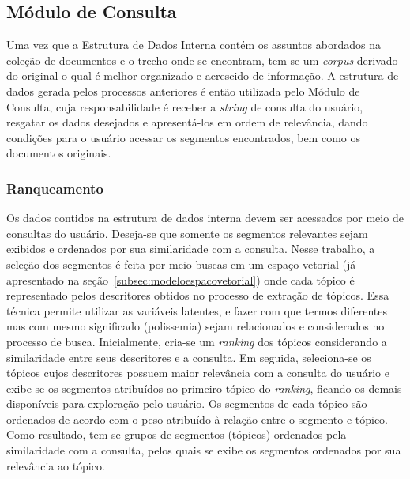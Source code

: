 
\subsection{Módulo de Consulta}


Uma vez que a Estrutura de Dados Interna contém os assuntos abordados na coleção de documentos e o trecho onde se encontram, tem-se um \textit{corpus} derivado do original o qual é melhor organizado e acrescido de informação. A estrutura de dados gerada pelos processos anteriores é então utilizada pelo Módulo de Consulta, cuja responsabilidade é receber a \textit{string} de consulta do usuário, resgatar os dados desejados e apresentá-los em ordem de relevância, dando condições para o usuário acessar os segmentos encontrados, bem como os documentos originais.

\subsubsection{Ranqueamento}
\label{sec-ranqueamento}

Os dados contidos na estrutura de dados interna devem ser acessados por meio de consultas do usuário. Deseja-se que somente os segmentos relevantes sejam exibidos e ordenados por sua similaridade com a consulta. 
Nesse trabalho, a seleção dos segmentos é feita por meio buscas em um espaço vetorial (já apresentado na seção~\ref{subsec:modeloespacovetorial}) onde cada tópico é representado pelos descritores obtidos no processo de extração de tópicos. Essa técnica permite utilizar as variáveis latentes, e fazer com que termos diferentes mas com mesmo significado (polissemia) sejam relacionados e considerados no processo de busca.
Inicialmente, cria-se um \textit{ranking} dos tópicos considerando a similaridade entre seus descritores e a consulta. Em seguida, seleciona-se os tópicos cujos descritores possuem maior relevância com a consulta do usuário e exibe-se os segmentos atribuídos ao primeiro tópico do \textit{ranking}, ficando os demais disponíveis para exploração pelo usuário. 
Os segmentos de cada tópico são ordenados de acordo com o peso atribuído à relação entre o segmento e tópico.  Como resultado, tem-se grupos de segmentos (tópicos) ordenados pela similaridade com a consulta, pelos quais se exibe os segmentos ordenados por sua relevância ao tópico. 






